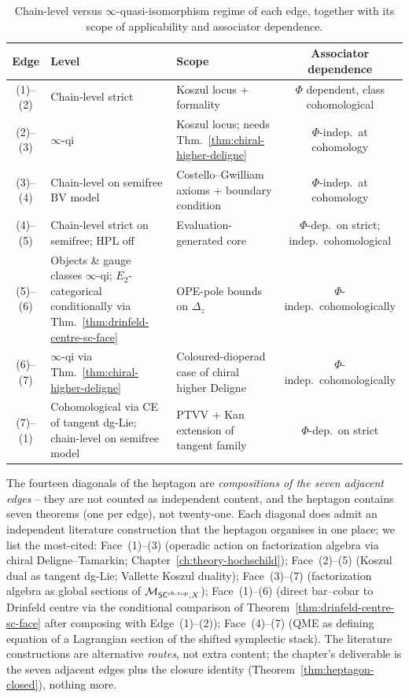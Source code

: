 \begin{table}[h]
\centering
\begin{tabular}{cllc}
\toprule
Edge & Level & Scope & Associator dependence \\
\midrule
(1)--(2) & Chain-level strict & Koszul locus + formality & $\Phi$
dependent, class cohomological \\
(2)--(3) & $\infty$-qi & Koszul locus; needs
Thm.~\ref{thm:chiral-higher-deligne} & $\Phi$-indep.\ at
cohomology \\
(3)--(4) & Chain-level on semifree BV model & Costello--Gwilliam
axioms + boundary condition & $\Phi$-indep.\ at cohomology \\
(4)--(5) & Chain-level strict on semifree; HPL off & Evaluation-generated
core & $\Phi$-dep.\ on strict; indep.\ cohomological \\
(5)--(6) & Objects \& gauge classes $\infty$-qi;
$E_2$-categorical conditionally via
Thm.~\ref{thm:drinfeld-centre-sc-face}
& OPE-pole bounds on
$\Delta_z$ & $\Phi$-indep.\ cohomologically \\
(6)--(7) & $\infty$-qi via
Thm.~\ref{thm:chiral-higher-deligne} & Coloured-dioperad case
of chiral higher Deligne & $\Phi$-indep.\ cohomologically \\
(7)--(1) & Cohomological via CE of tangent dg-Lie; chain-level on
semifree model & PTVV + Kan extension of tangent family &
$\Phi$-dep.\ on strict \\
\bottomrule
\end{tabular}
\caption{Chain-level versus $\infty$-quasi-isomorphism regime of each
edge, together with its scope of applicability and associator
dependence.}
\label{tab:heptagon-edges-regime}
\end{table}

\begin{remark}\label{rem:heptagon-diagonals}%
The fourteen diagonals of the heptagon are \emph{compositions of the
seven adjacent edges} -- they are not counted as independent content,
and the heptagon contains seven theorems (one per edge), not
twenty-one. Each diagonal does admit an independent literature
construction that the heptagon organises in one place; we list
the most-cited:
Face~(1)--(3) (operadic action on factorization algebra via chiral
Deligne--Tamarkin; Chapter~\ref{ch:theory-hochschild});
Face~(2)--(5) (Koszul dual as tangent dg-Lie; Vallette Koszul duality);
Face~(3)--(7) (factorization algebra as global sections of
$\mathcal{M}_{\mathsf{SC}^{\mathrm{ch},\mathrm{top}},X}$); Face~(1)--(6) (direct bar--cobar to Drinfeld centre
via the conditional comparison of
Theorem~\ref{thm:drinfeld-centre-sc-face} after composing with
Edge~(1)--(2)); Face~(4)--(7) (QME as defining equation of a Lagrangian
section of the shifted symplectic stack). The literature
constructions are alternative \emph{routes}, not extra content; the
chapter's deliverable is the seven adjacent edges plus the closure
identity (Theorem~\ref{thm:heptagon-closed}), nothing more.
\end{remark}

